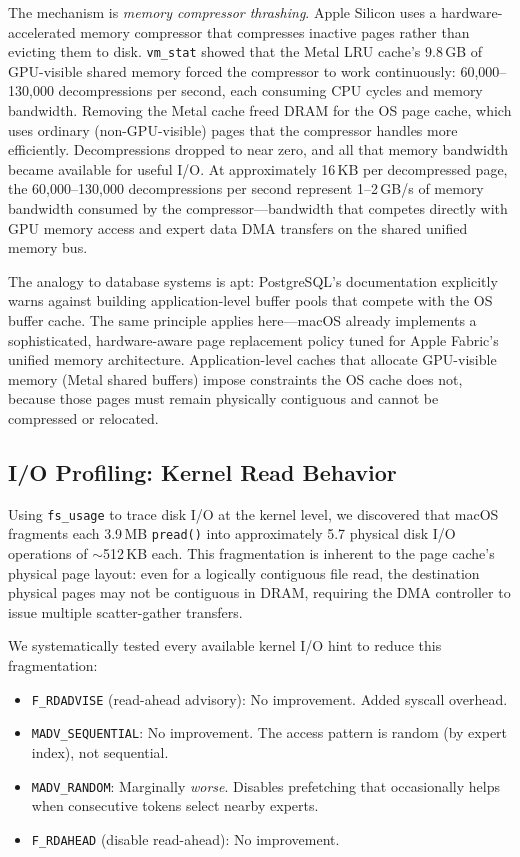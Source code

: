 \documentclass[11pt,twocolumn]{article}
\begin{document}
The mechanism is \emph{memory compressor thrashing}.
Apple Silicon uses a hardware-accelerated memory compressor that compresses inactive pages rather than evicting them to disk.
\texttt{vm\_stat} showed that the Metal LRU cache's 9.8\,GB of GPU-visible shared memory forced the compressor to work continuously: 60,000--130,000 decompressions per second, each consuming CPU cycles and memory bandwidth.
Removing the Metal cache freed DRAM for the OS page cache, which uses ordinary (non-GPU-visible) pages that the compressor handles more efficiently.
Decompressions dropped to near zero, and all that memory bandwidth became available for useful I/O.
At approximately 16\,KB per decompressed page, the 60{,}000--130{,}000 decompressions per second represent 1--2\,GB/s of memory bandwidth consumed by the compressor---bandwidth that competes directly with GPU memory access and expert data DMA transfers on the shared unified memory bus.

The analogy to database systems is apt: PostgreSQL's documentation explicitly warns against building application-level buffer pools that compete with the OS buffer cache.
The same principle applies here---macOS already implements a sophisticated, hardware-aware page replacement policy tuned for Apple Fabric's unified memory architecture.
Application-level caches that allocate GPU-visible memory (Metal shared buffers) impose constraints the OS cache does not, because those pages must remain physically contiguous and cannot be compressed or relocated.

\subsection{I/O Profiling: Kernel Read Behavior}
\label{sec:io_profiling}

Using \texttt{fs\_usage} to trace disk I/O at the kernel level, we discovered that macOS fragments each 3.9\,MB \texttt{pread()} into approximately 5.7 physical disk I/O operations of $\sim$512\,KB each.
This fragmentation is inherent to the page cache's physical page layout: even for a logically contiguous file read, the destination physical pages may not be contiguous in DRAM, requiring the DMA controller to issue multiple scatter-gather transfers.

We systematically tested every available kernel I/O hint to reduce this fragmentation:

\begin{itemize}[leftmargin=*,itemsep=2pt]
    \item \texttt{F\_RDADVISE} (read-ahead advisory): No improvement. Added syscall overhead.
    \item \texttt{MADV\_SEQUENTIAL}: No improvement. The access pattern is random (by expert index), not sequential.
    \item \texttt{MADV\_RANDOM}: Marginally \emph{worse}. Disables prefetching that occasionally helps when consecutive tokens select nearby experts.
    \item \texttt{F\_RDAHEAD} (disable read-ahead): No improvement.
\end{itemize}
\end{document}
